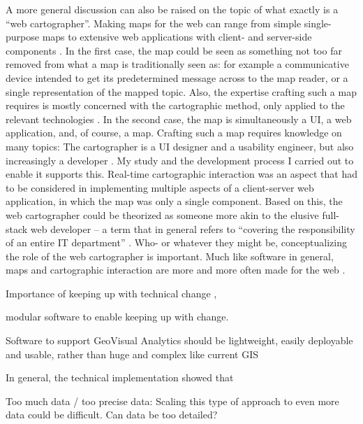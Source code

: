 A more general discussion can also be raised on the topic of what exactly is
a \enquote{web cartographer}.
Making maps for the web can range from simple
single-purpose maps to extensive web applications with
client- and server-side components \parencite{vee2017, mai2017}.
In the first case,
the map could be seen as something not too far removed from
what a map is traditionally seen as: for example a communicative
device intended to get its predetermined message across to the map reader,
or a single representation of the mapped topic.
Also, the expertise crafting such a map requires is mostly concerned with
the cartographic method, only applied to the relevant technologies \parencite{rot2021}.
In the second case,
the map is simultaneously a UI, a web application, and, of course, a map.
Crafting such a map requires knowledge on many topics:
The cartographer is a UI designer and a usability engineer,
but also increasingly a developer \parencite{rot2017, mai2017}.
My study and the development process I carried out to enable it supports this.
Real-time cartographic interaction was an aspect that had to be considered
in implementing multiple aspects of a client-server web application, in which the map
was only a single component.
Based on this,
the web cartographer could be theorized as
someone more akin to the elusive full-stack web developer --
a term that in general refers to \enquote{covering the responsibility of an entire IT
department} \parencite[p.~370]{tai2021}.
Who- or whatever they might be, conceptualizing the role of the web cartographer is important.
Much like software in general, maps and cartographic interaction
are more and more often made for the web \parencite{tai2017, rot2021, rot2014, vee2017}.





Importance of keeping up with technical change \parencite{rot2014},

modular software to enable keeping up with change.

Software to support GeoVisual Analytics should be lightweight, easily %
deployable and usable, rather than huge and complex like current GIS


In general, the technical implementation showed that


Too much data / too precise data:
Scaling this type of approach to even more data could be difficult.
Can data be too detailed?

